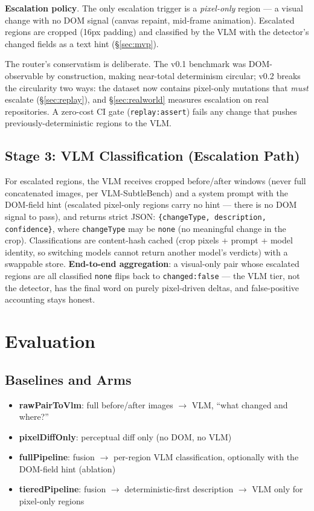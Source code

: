 \documentclass[10pt,twocolumn,letterpaper]{article}
\begin{document}
\textbf{Escalation policy}. The only escalation trigger is a \textit{pixel-only} region — a visual change with no DOM signal (canvas repaint, mid-frame animation). Escalated regions are cropped (16px padding) and classified by the VLM with the detector's changed fields as a text hint (\S\ref{sec:mvp}).

The router's conservatism is deliberate. The v0.1 benchmark was DOM-observable by construction, making near-total determinism circular; v0.2 breaks the circularity two ways: the dataset now contains pixel-only mutations that \textit{must} escalate (\S\ref{sec:replay}), and \S\ref{sec:realworld} measures escalation on real repositories. A zero-cost CI gate (\texttt{replay:assert}) fails any change that pushes previously-deterministic regions to the VLM.

\subsection{Stage 3: VLM Classification (Escalation Path)}

For escalated regions, the VLM receives cropped before/after windows (never full concatenated images, per VLM-SubtleBench) and a system prompt with the DOM-field hint (escalated pixel-only regions carry no hint — there is no DOM signal to pass), and returns strict JSON: \texttt{\{changeType, description, confidence\}}, where \texttt{changeType} may be \texttt{none} (no meaningful change in the crop). Classifications are content-hash cached (crop pixels + prompt + model identity, so switching models cannot return another model's verdicts) with a swappable store. \textbf{End-to-end aggregation}: a visual-only pair whose escalated regions are all classified \texttt{none} flips back to \texttt{changed:false} — the VLM tier, not the detector, has the final word on purely pixel-driven deltas, and false-positive accounting stays honest.

\section{Evaluation}

\subsection{Baselines and Arms}

\begin{itemize}
\item \textbf{rawPairToVlm}: full before/after images $\rightarrow$ VLM, ``what changed and where?''
\item \textbf{pixelDiffOnly}: perceptual diff only (no DOM, no VLM)
\item \textbf{fullPipeline}: fusion $\rightarrow$ per-region VLM classification, optionally with the DOM-field hint (ablation)
\item \textbf{tieredPipeline}: fusion $\rightarrow$ deterministic-first description $\rightarrow$ VLM only for pixel-only regions
\end{itemize}
\end{document}

